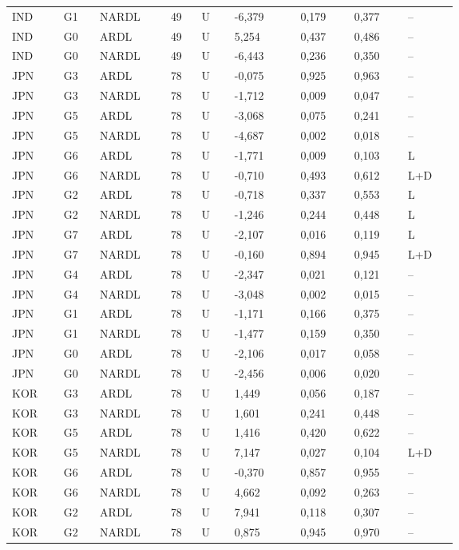 {\begin{longtable}{p{0.075\linewidth}p{0.05\linewidth}p{0.09\linewidth}p{0.04\linewidth}p{0.05\linewidth}p{0.1\linewidth}p{0.085\linewidth}p{0.085\linewidth}p{0.075\linewidth}}
IND & G1 & NARDL & 49 & U & -6,379 & 0,179 & 0,377 & --\\
IND & G0 & ARDL & 49 & U & 5,254 & 0,437 & 0,486 & --\\
IND & G0 & NARDL & 49 & U & -6,443 & 0,236 & 0,350 & --\\
JPN & G3 & ARDL & 78 & U & -0,075 & 0,925 & 0,963 & --\\
JPN & G3 & NARDL & 78 & U & -1,712 & 0,009 & 0,047 & --\\
JPN & G5 & ARDL & 78 & U & -3,068 & 0,075 & 0,241 & --\\
JPN & G5 & NARDL & 78 & U & -4,687 & 0,002 & 0,018 & --\\
JPN & G6 & ARDL & 78 & U & -1,771 & 0,009 & 0,103 & L\\
JPN & G6 & NARDL & 78 & U & -0,710 & 0,493 & 0,612 & L+D\\
JPN & G2 & ARDL & 78 & U & -0,718 & 0,337 & 0,553 & L\\
JPN & G2 & NARDL & 78 & U & -1,246 & 0,244 & 0,448 & L\\
JPN & G7 & ARDL & 78 & U & -2,107 & 0,016 & 0,119 & L\\
JPN & G7 & NARDL & 78 & U & -0,160 & 0,894 & 0,945 & L+D\\
JPN & G4 & ARDL & 78 & U & -2,347 & 0,021 & 0,121 & --\\
JPN & G4 & NARDL & 78 & U & -3,048 & 0,002 & 0,015 & --\\
JPN & G1 & ARDL & 78 & U & -1,171 & 0,166 & 0,375 & --\\
JPN & G1 & NARDL & 78 & U & -1,477 & 0,159 & 0,350 & --\\
JPN & G0 & ARDL & 78 & U & -2,106 & 0,017 & 0,058 & --\\
JPN & G0 & NARDL & 78 & U & -2,456 & 0,006 & 0,020 & --\\
KOR & G3 & ARDL & 78 & U & 1,449 & 0,056 & 0,187 & --\\
KOR & G3 & NARDL & 78 & U & 1,601 & 0,241 & 0,448 & --\\
KOR & G5 & ARDL & 78 & U & 1,416 & 0,420 & 0,622 & --\\
KOR & G5 & NARDL & 78 & U & 7,147 & 0,027 & 0,104 & L+D\\
KOR & G6 & ARDL & 78 & U & -0,370 & 0,857 & 0,955 & --\\
KOR & G6 & NARDL & 78 & U & 4,662 & 0,092 & 0,263 & --\\
KOR & G2 & ARDL & 78 & U & 7,941 & 0,118 & 0,307 & --\\
KOR & G2 & NARDL & 78 & U & 0,875 & 0,945 & 0,970 & --\\

\end{longtable}}
